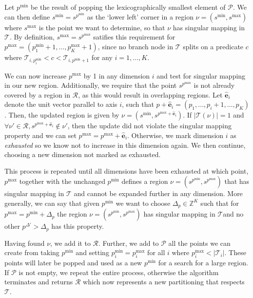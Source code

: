 Let $p^{\min}$ be the result of popping the lexicographically smallest element
of $\mathcal{P}$. We can then define $s^{\min} = s^{p^{\min}}$ as the `lower
left' corner in a region $\nu = (s^{\min}, s^{\max})$ where $s^{\max}$ is the
point we want to determine, so that $\nu$ has singular mapping in $\mathcal{T}$.
By definition, $s^{\max} = s^{p^{\max}}$ satifies this requirement for $p^{\max}
= (p^{\min}_{1} + 1, \ldots, p^{\max}_{K} + 1)$, since no branch node in
$\mathcal{T}$ splits on a predicate $c$ where $\mathcal{T}_{i,p^{\min}_{i}} < c
< \mathcal{T}_{i,p^{\min} + 1}$ for any $i = 1, \ldots, K$. 

We can now increase $p^{\max}$ by 1 in any dimension $i$ and test for singular
mapping in our new region. Additionally, we require that the point
$s^{p^{\max}}$ is not already covered by a region in $\mathcal{R}$, as this
would result in overlapping regions. Let $\mathbf{\hat{e}}_i$ denote the unit
vector parallel to axis $i$, such that $p + \mathbf{\hat{e}}_i = (p_1,\ldots,p_i
+ 1,\ldots,p_K)$. Then, the updated region is given by $\nu = (s^{\min},
s^{p^{\max} + \mathbf{\hat{e}}_{i}})$. If $|\mathcal{T}(\nu)| = 1$ and $\forall
\nu' \in \mathcal{R}, s^{p^{\max} + \mathbf{\hat{e}}_{i}} \notin \nu'$, then the
update did not violate the singular mapping property and we can set $p^{\max} =
p^{\max} + \mathbf{\hat{e}}_{i}$. Otherwise, we mark dimension $i$ as
\textit{exhausted} so we know not to increase in this dimension again. We then
continue, choosing a new dimension not marked as exhausted.

This process is repeated until all dimensions have been exhausted at which
point, $p^{\max}$ together with the unchanged $p^{\min}$ defines a region $\nu =
(s^{p^{\min}}, s^{p^{\max}})$ that has singular mapping in $\mathcal{T}$ and
cannot be expanded further in any dimension. More generally, we can say that
given $p^{\min}$ we want to choose $\Delta_{p} \in \mathbb{Z}^{K}$ such that for
$p^{\max} = p^{\min} + \Delta_{p}$ the region $\nu = (s^{p^{\min}},
s^{p^{\max}})$ has singular mapping in $\mathcal{T} $and no other $p^{\Delta'} >
\Delta_{p}$ has this property.

Having found $\nu$, we add it to $\mathcal{R}$. Further, we add to $\mathcal{P}$
all the points we can create from taking $p^{\min}$ and setting $p^{\min}_{i} =
p^{\max}_{i}$ for all $i$ where $p^{\max}_{i} < |\mathcal{T}_{i}|$. These points
will later be popped and used as a new $p^{\min}$ for a search for a large
region. If $\mathcal{P}$ is not empty, we repeat the entire process, otherwise
the algorithm terminates and returns $\mathcal{R}$ which now represents a new
partitioning that respects $\mathcal{T}$.


